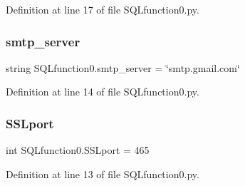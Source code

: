 Definition at line 17 of file S\+Q\+Lfunction0.\+py.

\mbox{\label{namespace_s_q_lfunction0_ab3dced66a9775c45598296b3e0f20384}} 
\subsubsection{smtp\+\_\+server}
{\footnotesize\ttfamily string S\+Q\+Lfunction0.\+smtp\+\_\+server = \char`\"{}smtp.\+gmail.\+com\char`\"{}}



Definition at line 14 of file S\+Q\+Lfunction0.\+py.

\mbox{\label{namespace_s_q_lfunction0_a4f79b287bc6d361c461836921fb01ee8}} 
\subsubsection{S\+S\+Lport}
{\footnotesize\ttfamily int S\+Q\+Lfunction0.\+S\+S\+Lport = 465}



Definition at line 13 of file S\+Q\+Lfunction0.\+py.

